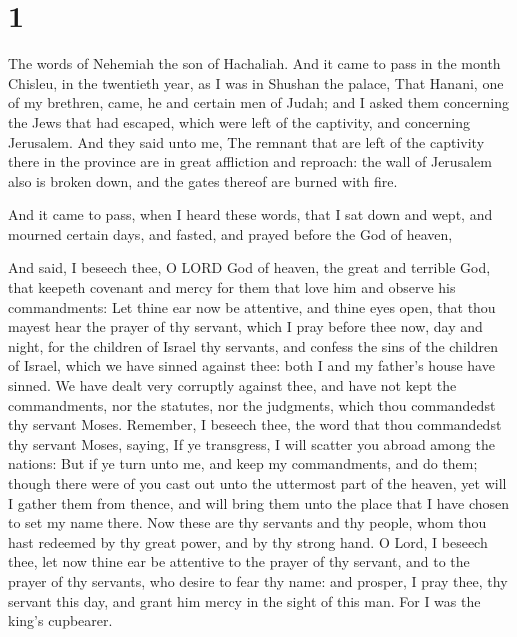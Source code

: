 \hypertarget{section}{%
\section{1}\label{section}}

 The words of Nehemiah the son of Hachaliah. And it came
to pass in the month Chisleu, in the twentieth year, as I was in Shushan
the palace,  That Hanani, one of my brethren, came, he and
certain men of Judah; and I asked them concerning the Jews that had
escaped, which were left of the captivity, and concerning Jerusalem.
 And they said unto me, The remnant that are left of the
captivity there in the province are in great affliction and reproach:
the wall of Jerusalem also is broken down, and the gates thereof are
burned with fire.

 And it came to pass, when I heard these words, that I sat
down and wept, and mourned certain days, and fasted, and prayed before
the God of heaven,

 And said, I beseech thee, O LORD God of heaven, the great
and terrible God, that keepeth covenant and mercy for them that love him
and observe his commandments:  Let thine ear now be
attentive, and thine eyes open, that thou mayest hear the prayer of thy
servant, which I pray before thee now, day and night, for the children
of Israel thy servants, and confess the sins of the children of Israel,
which we have sinned against thee: both I and my father's house have
sinned.  We have dealt very corruptly against thee, and
have not kept the commandments, nor the statutes, nor the judgments,
which thou commandedst thy servant Moses.  Remember, I
beseech thee, the word that thou commandedst thy servant Moses, saying,
If ye transgress, I will scatter you abroad among the nations:
 But if ye turn unto me, and keep my commandments, and do
them; though there were of you cast out unto the uttermost part of the
heaven, yet will I gather them from thence, and will bring them unto the
place that I have chosen to set my name there.  Now these
are thy servants and thy people, whom thou hast redeemed by thy great
power, and by thy strong hand.  O Lord, I beseech thee,
let now thine ear be attentive to the prayer of thy servant, and to the
prayer of thy servants, who desire to fear thy name: and prosper, I pray
thee, thy servant this day, and grant him mercy in the sight of this
man. For I was the king's cupbearer.

